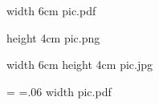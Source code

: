 \pdfximage width 6cm {pic.pdf}  %
\pdfrefximage \pdflastximage    %

\pdfximage height 4cm {pic.png} %

\edef\MyImg{\the\pdflastximage} %
\pdfrefximage\MyImg

\pdfximage width 6cm height 4cm %
   {pic.jpg}                    %

=\hbox{\pdfrefximage\pdflastximage} %
=.06         %
\pdfximage              %
    width  {pic.pdf}  %
\pdfrefximage \pdflastximage

\newpage



